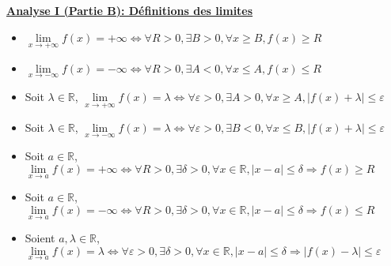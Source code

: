 \documentclass[a4paper,11pt]{report}
\begin{document}
\renewcommand{\labelitemi}{$\cdot$}
\begin{Large}\begin{center} 
   \underline{\textbf{Analyse I (Partie B): Définitions des limites}} 
\end{center}\end{Large}

\begin{itemize}
	\item $\lim\limits_{x \rightarrow +\infty}{f(x)} = +\infty \iff \forall R > 0, \exists B >0 , \forall x \ge B, f(x) \ge R$\\
	
	\item $\lim\limits_{x \rightarrow -\infty}{f(x)} = -\infty \iff \forall R > 0, \exists A < 0, \forall x \le A, f(x) \le R$\\
	
	\item Soit $\lambda \in \mathbb{R}$, $\lim\limits_{x \rightarrow +\infty}{f(x)} = \lambda \iff \forall \varepsilon > 0, \exists A > 0, \forall x \ge A, |f(x)+\lambda|\le \varepsilon$\\
	
	\item Soit $\lambda \in \mathbb{R}$, $\lim\limits_{x \rightarrow -\infty}{f(x)} = \lambda \iff \forall \varepsilon > 0, \exists B < 0, \forall x \le B, |f(x)+\lambda| \le \varepsilon$\\
	
	\item Soit $a \in \mathbb{R}$, $\lim\limits_{x \rightarrow a}{f(x)} = +\infty \iff \forall R > 0, \exists \delta > 0, \forall x \in \mathbb{R}, |x-a| \le \delta \Rightarrow f(x) \ge R$\\
	
	\item Soit $a \in \mathbb{R}$, $\lim\limits_{x \rightarrow a}{f(x)} = -\infty \iff \forall R > 0, \exists \delta > 0, \forall x \in \mathbb{R}, |x-a| \le \delta \Rightarrow f(x) \le R$\\
	
	\item Soient $a,\lambda \in \mathbb{R}$, $\lim\limits_{x \rightarrow a}{f(x)} = \lambda \iff \forall \varepsilon > 0, \exists \delta > 0, \forall x \in \mathbb{R}, |x-a| \le \delta \Rightarrow |f(x)-\lambda| \le \varepsilon$\\
\end{itemize}
\end{document}
